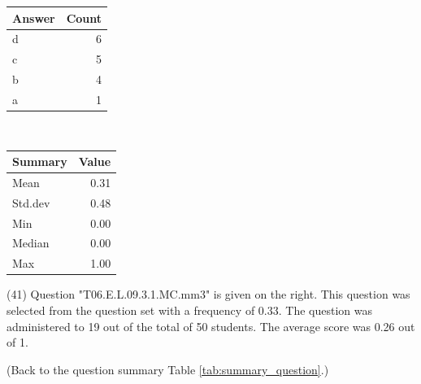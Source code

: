 \documentclass[12pt,english,nohyper]{tufte-handout}\usepackage[]{graphicx}\usepackage[]{color}
\begin{document}
\begin{center}%
\begin{tabular}{lr}
  \hline
Answer & Count \\ 
  \hline
d &   6 \\ 
  c &   5 \\ 
  b &   4 \\ 
  a &   1 \\ 
   \hline
\end{tabular}
~~~~~~~~%
\begin{tabular}{lr}
  \hline
Summary & Value \\ 
  \hline
Mean & 0.31 \\ 
  Std.dev & 0.48 \\ 
  Min & 0.00 \\ 
  Median & 0.00 \\ 
  Max & 1.00 \\ 
   \hline
\end{tabular}
\end{center}\newpage{} (41) Question "T06.E.L.09.3.1.MC.mm3" is given on the right. This question was selected from the question set with a frequency of 0.33. The question was administered to 19 out of the total of 50 students. The average score was 0.26 out of 1.

 (Back to the question summary Table \ref{tab:summary_question}.)
\end{document}
